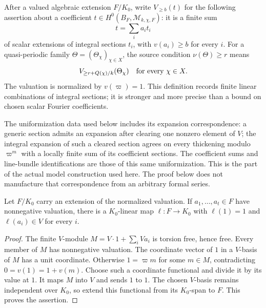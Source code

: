 After a valued algebraic extension \(F/K_0\), write
\(V_{\ge b}(t)\) for the following assertion about a coefficient
\(t\in H^0(B_F,\mathcal M_{k,\chi,F})\):
it is a finite sum
\[
                         t=\sum_i a_i t_i
\]
of scalar extensions of integral sections \(t_i\), with
\(v(a_i)\ge b\) for every \(i\).
For a quasi-periodic family \(\Theta=(\Theta_\chi)_{\chi\in X}\),
the source condition \(\nu(\Theta)\ge r\) means
\begin{equation}\label{eq:ftb-nuge-definition}
 V_{\ge r+Q(\chi)/k}(\Theta_\chi)
                          \quad\hbox{for every }\chi\in X.
\end{equation}
The valuation is normalized by \(v(\varpi)=1\).
This definition records finite linear combinations of integral
sections; it is stronger and more precise than a bound on chosen
scalar Fourier coefficients.

The uniformization data used below includes its expansion
correspondence: a generic section admits an expansion after clearing
one nonzero element of \(V\); the integral expansion of such a cleared
section agrees on every thickening modulo \(\varpi^m\) with a locally
finite sum of its coefficient sections.  The coefficient sums and
line-bundle identifications are those of this same uniformization.
This is the part of the actual model construction used here.
The proof below does not manufacture that correspondence from an
arbitrary formal series.

\begin{srlemma}
\label{lem:ftb-valued-retraction}
Let \(F/K_0\) carry an extension of the normalized valuation.
If \(a_1,\ldots,a_t\in F\) have nonnegative valuation, there is a
\(K_0\)-linear map \(\ell:F\to K_0\) with
\(\ell(1)=1\) and \(\ell(a_i)\in V\) for every \(i\).
\end{srlemma}
\begin{proof}
The finite \(V\)-module
\(M=V\cdot1+\sum_iV a_i\) is torsion free, hence free.
Every member of \(M\) has nonnegative valuation.
The coordinate vector of \(1\) in a \(V\)-basis of \(M\) has a unit
coordinate.  Otherwise \(1=\varpi m\) for some \(m\in M\), contradicting
\(0=v(1)=1+v(m)\).
Choose such a coordinate functional and divide it by its value at
\(1\).  It maps \(M\) into \(V\) and sends \(1\) to \(1\).
The chosen \(V\)-basis remains independent over \(K_0\), so extend this
functional from its \(K_0\)-span to \(F\).
This proves the assertion.
\end{proof}

